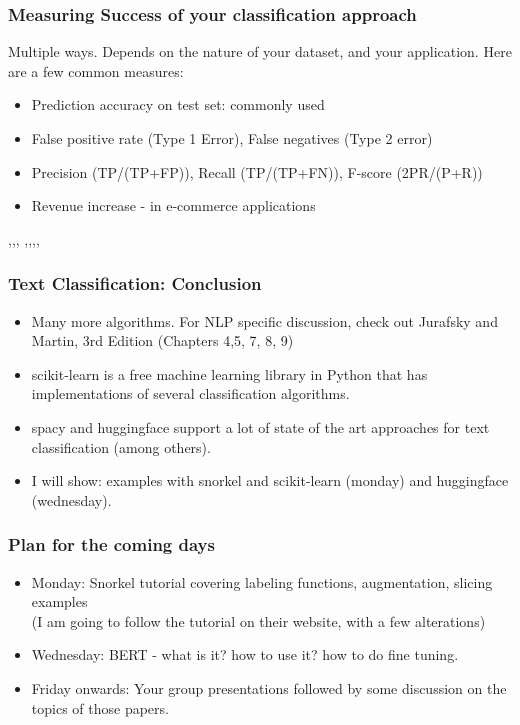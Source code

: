 \documentclass{beamer}
\begin{document}
\begin{frame}
\frametitle{Measuring Success of your classification approach}
Multiple ways. Depends on the nature of your dataset, and your application. Here are a few common measures:
\begin{itemize}
\item Prediction accuracy on test set: commonly used
\item False positive rate (Type 1 Error), False negatives (Type 2 error) 
\item Precision (TP/(TP+FP)), Recall (TP/(TP+FN)), F-score (2PR/(P+R))
\item Revenue increase - in e-commerce applications
\end{itemize}
,,, ,,,,
\end{frame}

\begin{frame}
\frametitle{Text Classification: Conclusion}
\begin{itemize} 
\item Many more algorithms. For NLP specific discussion, check out Jurafsky and Martin, 3rd Edition (Chapters 4,5, 7, 8, 9)
\item scikit-learn is a free machine learning library in Python that has implementations of several classification algorithms. 
\item spacy and huggingface support a lot of state of the art approaches for text classification (among others). 
\item I will show: examples with snorkel and scikit-learn (monday) and huggingface (wednesday). 
\end{itemize}
\end{frame}

\begin{frame}
\frametitle{Plan for the coming days}
\begin{itemize}
    \item Monday: Snorkel tutorial covering labeling functions, augmentation, slicing examples
   \\  (I am going to follow the tutorial on their website, with a few alterations) 
   \item Wednesday: BERT - what is it? how to use it? how to do fine tuning.
   \item Friday onwards: Your group presentations followed by some discussion on the topics of those papers. 
\end{itemize}
\end{frame}
\end{document}
